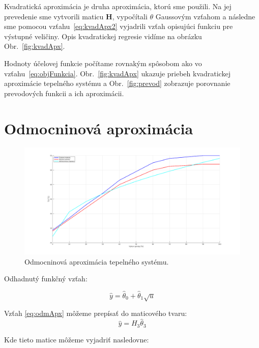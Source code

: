 \documentclass{article}
\begin{document}
Kvadratická aproximácia je druha aproximácia, ktorú sme použili.
Na jej prevedenie sme vytvorili maticu \textbf{H}, vypočítali
\(\theta\) Gaussovým vzťahom a následne sme pomocou vzťahu~\ref{eq:kvadApx2}
vyjadrili vzťah opisujúci funkciu pre výstupné veličiny. Opis kvadratickej
regresie vidíme na obrázku Obr.~\ref{fig:kvadApx}.

Hodnoty účelovej funkcie počítame rovnakým spôsobom ako vo vzťahu~\ref{eq:objFunkcia}.
Obr.~\ref{fig:kvadApx} ukazuje priebeh kvadratickej aproximácie tepelného systému a
Obr.~\ref{fig:prevod} zobrazuje porovnanie prevodových funkcii a ich aproximácii.

\clearpage

\section{Odmocninová aproximácia}
\label{sec:odm}

\begin{figure}[!htbp]
	\begin{center}
		\includegraphics[width=\textwidth]{include/odmocninova_regresia.png}
	\end{center}
	\caption{Odmocninová aproximácia tepelného systému.}
	\label{fig:odmApx}
\end{figure}

Odhadnutý funkčný vzťah:

\begin{equation}
	\hat{y} = \hat{\theta}_0 + \hat{\theta}_1 \sqrt{u}
	\label{eq:odmApx}
\end{equation}

Vzťah \ref{eq:odmApx} môžeme prepísať do maticového tvaru:
\begin{equation}
	\hat{y} = H_3\hat{\theta}_3
	\label{eq:odmApx2}
\end{equation}

Kde tieto matice môžeme vyjadriť nasledovne:
\end{document}
